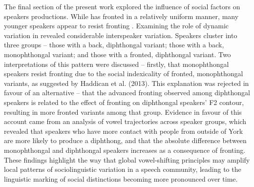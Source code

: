\documentclass[12pt]{article}
\begin{document}
The final section of the present work explored the influence of social factors on speakers  productions. While  has fronted in a relatively uniform manner, many younger speakers appear to resist fronting . Examining the role of dynamic variation in  revealed considerable interspeaker variation. Speakers cluster into three groups -- those with a back, diphthongal variant; those with a back, monophthongal variant; and those with a fronted, diphthongal variant. Two interpretations of this pattern were discussed -- firstly, that monophthongal speakers resist fronting due to the social indexicality of fronted, monophthongal variants, as suggested by Haddican et al. (2013). This explanation was rejected in favour of an alternative -- that the advanced fronting observed among diphthongal speakers is related to the effect of fronting on diphthongal speakers' F2 contour, resulting in more fronted variants among that group. Evidence in favour of this account came from an analysis of vowel trajectories across speaker groups, which revealed that speakers who have more contact with people from outside of York are more likely to produce a diphthong, and that the absolute difference between monophthongal and diphthongal speakers increases as a consequence of fronting. These findings highlight the way that global vowel-shifting principles may amplify local patterns of sociolinguistic variation in a speech community, leading to the linguistic marking of social distinctions becoming more pronounced over time.

\nocite{*}

\end{document}

